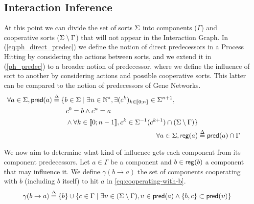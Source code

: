 \subsection{Interaction Inference}

At this point we can divide the set of sorts $\Sigma$ into components ($\Gamma$) and cooperative sorts
($\Sigma \setminus \Gamma$) that will not appear in the Interaction Graph. In (\ref{eq:ph_direct_predec})
we define the notion of direct predecessors in a Process Hitting by considering the actions between
sorts, and we extend it in (\ref{ph_predec}) to a broader notion of predecessor, where we define the
influence of sort to another by considering actions and possible cooperative sorts. This latter can
be compared to the notion of predecessors of Gene Networks. 
\begin{align}
\begin{split}
\forall a \in \Sigma, \mathsf{pred}(a) &\stackrel{\Delta}= \{b \in \Sigma \mid \exists n \in \mathbb{N}^*, \exists (c^k)_{k \in \llbracket 0 ; n \rrbracket} \in \Sigma^{n+1}, \\
                                   & \quad \quad c^0 = b \wedge c^n = a \\
                                   & \quad \quad \wedge \forall k \in \llbracket 0 ; n-1 \rrbracket,
								   c^k \in \Sigma^{-1}(c^{k+1}) \cap (\Sigma\setminus\Gamma)\}
\end{split}
\label{ph_predec}
\\
\forall a\in \Sigma, \mathsf{reg}({a}) & \stackrel{\Delta}= \mathsf{pred}(a) \cap \Gamma
\label{eq:regulators}
\end{align}

We now aim to determine what kind of influence gets each component from its component predecessors.
Let $a \in \Gamma$ be a component and $b \in \mathsf{reg}({b})$ a component that may influence it.
We define $\gamma(b\rightarrow a)$ the set of components cooperating with $b$ (including $b$ itself)
to hit $a$ in \eqref{eq:cooperating-with-b}.
\begin{align}
\begin{split}
\gamma(b\rightarrow a) \stackrel{\Delta}= \{ b \} \cup \{ c \in \Gamma \mid 
			\exists \upsilon\in(\Sigma\setminus\Gamma),
				\upsilon\in\mathsf{pred}(a) \wedge \{b,c\}\subset\mathsf{pred}(\upsilon) \}
\end{split}
\label{eq:cooperating-with-b}
\end{align}


